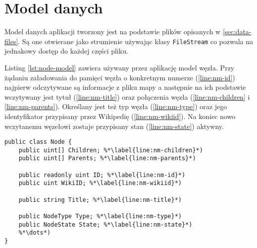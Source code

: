 \section{Model danych}
Model danych aplikacji tworzony jest na podstawie plików opisanych w \ref{sec:data-files}. Są one otwierane jako strumienie używając klasy \lstinline[basicstyle=\normalsize]{FileStream} co pozwala na jednakowy dostęp do każdej części pliku. 

Listing \ref{lst:node-model} zawiera używany przez aplikację model węzła. Przy żądaniu załadowania do pamięci węzła o konkretnym numerze (\ref{line:nm-id}) najpierw odczytywane są informacje z pliku mapy a następnie na ich podstawie wczytywany jest tytuł (\ref{line:nm-title}) oraz połączenia węzła (\ref{line:nm-children} i \ref{line:nm-parents}). Określany jest też typ węzła (\ref{line:nm-type}) oraz jego identyfikator przypisany przez Wikipedię (\ref{line:nm-wikiid}). Na koniec nowo wczytanemu węzełowi zostaje przypisany stan (\ref{line:nm-state}) aktywny.
\begin{lstlisting}[caption={Model węzła grafu}, label=lst:node-model]
public class Node {
	public uint[] Children; %*\label{line:nm-children}*)
	public uint[] Parents; %*\label{line:nm-parents}*)

	public readonly uint ID; %*\label{line:nm-id}*)
	public uint WikiID; %*\label{line:nm-wikiid}*)

	public string Title; %*\label{line:nm-title}*)

	public NodeType Type; %*\label{line:nm-type}*)
	public NodeState State; %*\label{line:nm-state}*)
	%*\dots*)
}
\end{lstlisting}
